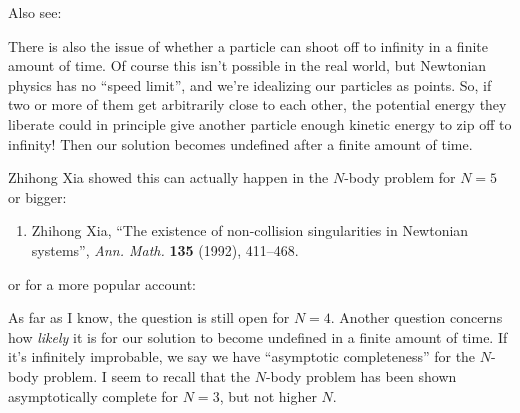 \documentclass{article}
\def\tightlist{}
\renewcommand{\texttt}[1]{%
  \begingroup
  \ttfamily
  \begingroup\lccode`~=`/\lowercase{\endgroup\def~}{/\discretionary{}{}{}}%
  \begingroup\lccode`~=`[\lowercase{\endgroup\def~}{[\discretionary{}{}{}}%
  \begingroup\lccode`~=`.\lowercase{\endgroup\def~}{.\discretionary{}{}{}}%
  \catcode`/=\active\catcode`[=\active\catcode`.=\active
  \scantokens{#1\noexpand}%
  \endgroup
}
\begin{document}
Also see:


There is also the issue of whether a particle can shoot off to infinity
in a finite amount of time. Of course this isn't possible in the real
world, but Newtonian physics has no ``speed limit'', and we're
idealizing our particles as points. So, if two or more of them get
arbitrarily close to each other, the potential energy they liberate
could in principle give another particle enough kinetic energy to zip
off to infinity! Then our solution becomes undefined after a finite
amount of time.

Zhihong Xia showed this can actually happen in the \(N\)-body problem
for \(N = 5\) or bigger:

\begin{enumerate}
\def\labelenumi{\arabic{enumi})}
\setcounter{enumi}{5}
\tightlist
\item
  Zhihong Xia, ``The existence of non-collision singularities in
  Newtonian systems'', \emph{Ann. Math.} \textbf{135} (1992), 411--468.
\end{enumerate}

or for a more popular account:


As far as I know, the question is still open for \(N = 4\). Another
question concerns how \emph{likely} it is for our solution to become
undefined in a finite amount of time. If it's infinitely improbable, we
say we have ``asymptotic completeness'' for the \(N\)-body problem. I
seem to recall that the \(N\)-body problem has been shown asymptotically
complete for \(N = 3\), but not higher \(N\).
\end{document}
